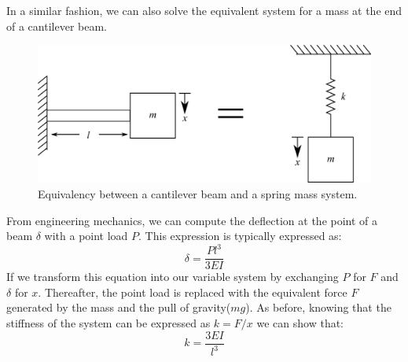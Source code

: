 \documentclass[12pt,letter]{article}
\begin{document}
			In a similar fashion, we can also solve the equivalent system for a mass at the end of a cantilever beam.
			\begin{figure}[H]
				\centering
				\includegraphics[]{../figures/spring_and_bar_mass_cantilever_beam.png}
				\caption{Equivalency between a cantilever beam and a spring mass system.}
			\end{figure}			
			From engineering mechanics, we can compute the deflection at the point of a beam $\delta$ with a point load $P$. This expression is typically expressed as:
			\begin{equation}
				\delta = \frac{Pl^3}{3EI}
			\end{equation}					
			If we transform this equation into our variable system by exchanging $P$ for $F$ and $\delta$ for $x$. Thereafter, the point load is replaced with the equivalent force $F$ generated by the mass and the pull of gravity($mg$). As before, knowing that the stiffness of the system can be expressed as $k=F/x$ we can show that:
			\begin{equation}
				k = \frac{3EI}{l^3}
			\end{equation}	
\end{document}

